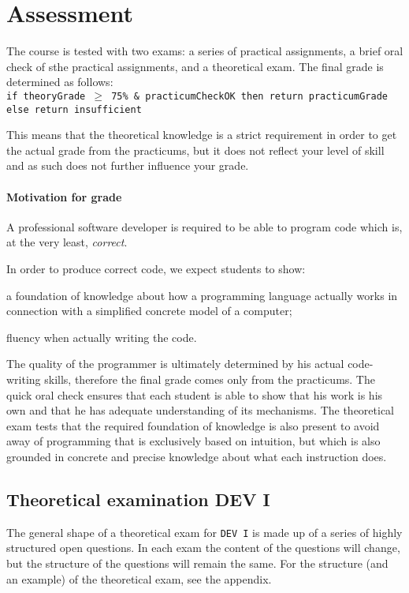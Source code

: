 \section{Assessment}
	The course is tested with two exams: a series of practical assignments, a brief oral check of sthe practical assignments, and a theoretical exam. The final grade is determined as follows: \\

	\texttt{if theoryGrade $\geq$ 75\% \& practicumCheckOK then return practicumGrade else return insufficient}

	This means that the theoretical knowledge is a strict requirement in order to get the actual grade from the practicums, but it does not reflect your level of skill and as such does not further influence your grade.

	\paragraph*{Motivation for grade}
		A professional software developer is required to be able to program code which is, at the very least, \textit{correct}.

		In order to produce correct code, we expect students to show:
		\begin{inparaenum}
			\item a foundation of knowledge about how a programming language actually works in connection with a simplified concrete model of a computer;
			\item fluency when actually writing the code.
		\end{inparaenum}

		The quality of the programmer is ultimately determined by his actual code-writing skills, therefore the final grade comes only from the practicums. The quick oral check ensures that each student is able to show that his work is his own and that he has adequate understanding of its mechanisms. The theoretical exam tests that the required foundation of knowledge is also present to avoid away of programming that is exclusively based on intuition, but which is also grounded in concrete and precise knowledge about what each instruction does.


	\subsection{Theoretical examination DEV I}
		The general shape of a theoretical exam for \texttt{DEV I} is made up of a series of highly structured open questions. In each exam the content of the questions will change, but the structure of the questions will remain the same. For the structure (and an example) of the theoretical exam, see the appendix.


